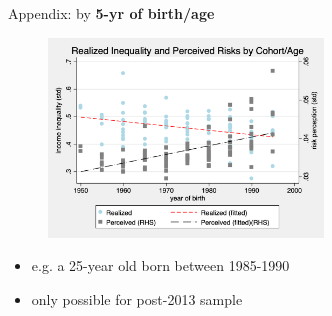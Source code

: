 \documentclass{beamer}
\begin{document}
\begin{frame}{Appendix: by \textbf{5-yr of birth/age}}
	\label{appendix:cohort_age_compare}
	\begin{figure}[ht]
		\centering
		\includegraphics[width=0.65\textwidth]{figures/real_log_wage_shk_by_byear_age_compare.png}
	\end{figure}
	\begin{itemize}
		\item e.g. a 25-year old born between 1985-1990
		\item only possible for post-2013 sample 
		\quad \hyperlink{cohort_age_compare}{}     
	\end{itemize}
\end{frame}
\end{document}

